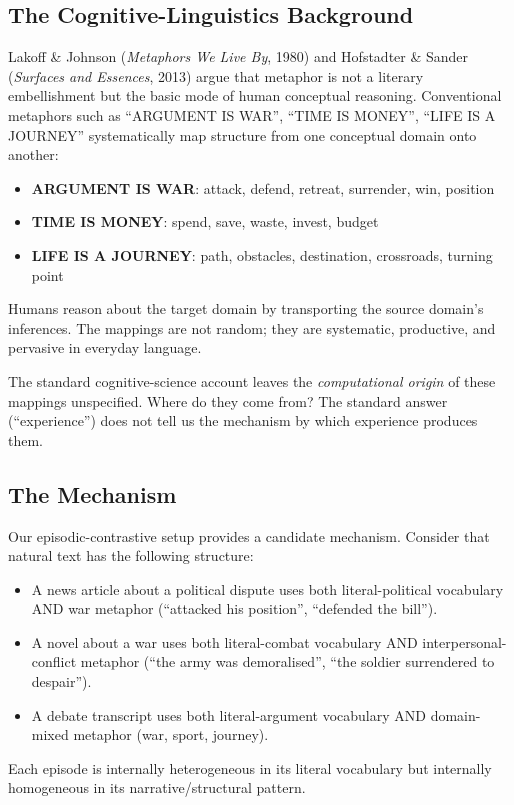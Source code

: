 \documentclass[11pt, a4paper]{article}
\theoremstyle{plain}
\theoremstyle{definition}
\theoremstyle{remark}
\begin{document}
\subsection{The Cognitive-Linguistics Background}

Lakoff \& Johnson (\emph{Metaphors We Live By}, 1980) and Hofstadter \& Sander (\emph{Surfaces and Essences}, 2013) argue that metaphor is not a literary embellishment but the basic mode of human conceptual reasoning.
Conventional metaphors such as ``ARGUMENT IS WAR'', ``TIME IS MONEY'', ``LIFE IS A JOURNEY'' systematically map structure from one conceptual domain onto another:
\begin{itemize}[nosep]
\item \textbf{ARGUMENT IS WAR}: attack, defend, retreat, surrender, win, position
\item \textbf{TIME IS MONEY}: spend, save, waste, invest, budget
\item \textbf{LIFE IS A JOURNEY}: path, obstacles, destination, crossroads, turning point
\end{itemize}
Humans reason about the target domain by transporting the source domain's inferences.
The mappings are not random; they are systematic, productive, and pervasive in everyday language.

The standard cognitive-science account leaves the \emph{computational origin} of these mappings unspecified.
Where do they come from?
The standard answer (``experience'') does not tell us the mechanism by which experience produces them.

\subsection{The Mechanism}

Our episodic-contrastive setup provides a candidate mechanism.
Consider that natural text has the following structure:
\begin{itemize}[nosep]
\item A news article about a political dispute uses both literal-political vocabulary AND war metaphor (``attacked his position'', ``defended the bill'').
\item A novel about a war uses both literal-combat vocabulary AND interpersonal-conflict metaphor (``the army was demoralised'', ``the soldier surrendered to despair'').
\item A debate transcript uses both literal-argument vocabulary AND domain-mixed metaphor (war, sport, journey).
\end{itemize}
Each episode is internally heterogeneous in its literal vocabulary but internally homogeneous in its narrative/structural pattern.
\end{document}
